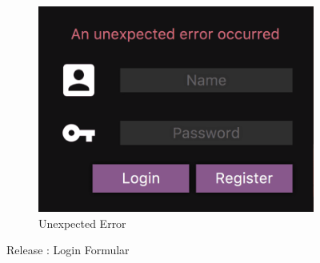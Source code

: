 \documentclass[12pt, titlepage]{scrartcl}
\newcommand{\RN}[1]{%
	\textup{\uppercase\expandafter{\romannumeral#1}}%
}
\begin{document}
\begin{figure}[H]
\begin{subfigure}[h]{0.3\linewidth}
                        \includegraphics[width=\linewidth]{images/old_state/login/UnexpectedError.png}
                        \caption{Unexpected Error}
                    \end{subfigure}
                    \caption{Release \RN{2}: Login Formular}
                    \label{Login_Form}
                \end{figure}
\end{document}
